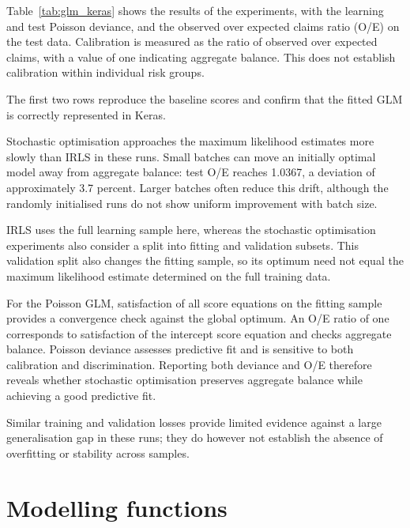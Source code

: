 \documentclass[a4paper]{article}
\begin{document}
Table~\ref{tab:glm_keras} shows the results of the experiments, with the learning and test Poisson deviance, and the observed over expected claims ratio (O/E) on the test data.
Calibration is measured as the ratio of observed over expected claims, with a value of one indicating aggregate balance.
This does not establish calibration within individual risk groups.

\addvspace{\baselineskip}
\noindent
\begin{minipage}{\textwidth}
    \label{tab:glm_keras}
    \centering
    \small
    \makebox[\linewidth][c]{}
\end{minipage}\par
\addvspace{\baselineskip}

The first two rows reproduce the baseline scores and confirm that the
fitted GLM is correctly represented in Keras.

Stochastic optimisation approaches the maximum likelihood estimates more
slowly than IRLS in these runs.
Small batches can move an initially optimal model away from aggregate
balance: test O/E reaches 1.0367, a deviation of approximately 3.7 percent.
Larger batches often reduce this drift, although the randomly initialised
runs do not show uniform improvement with batch size.

IRLS uses the full learning sample here, whereas the stochastic optimisation
experiments also consider a split into fitting and validation subsets.
This validation split also changes the fitting sample, so its optimum need
not equal the maximum likelihood estimate determined on the full training data.

For the Poisson GLM, satisfaction of all score equations on the fitting
sample provides a convergence check against the global optimum.
An O/E ratio of one corresponds to satisfaction of the intercept score
equation and checks aggregate balance.
Poisson deviance assesses predictive fit and is sensitive to both
calibration and discrimination.
Reporting both deviance and O/E therefore reveals whether stochastic
optimisation preserves aggregate balance while achieving a good predictive fit.

Similar training and validation losses provide limited evidence against
a large generalisation gap in these runs; they do however not establish the
absence of overfitting or stability across samples.

\section{Modelling functions}
\end{document}
